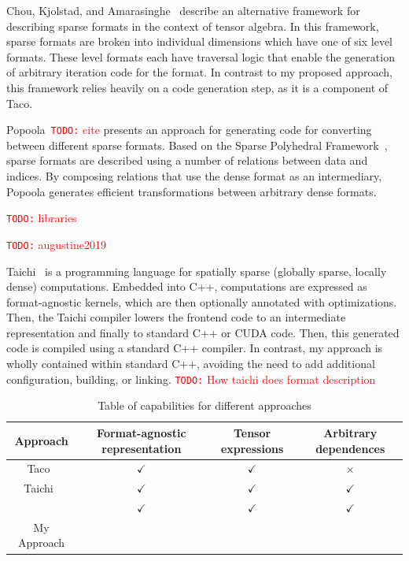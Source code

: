 \documentclass{article}
\newcommand{\todo}[1]{{\textcolor{red}{{\tt{TODO:}}\,\,#1 }}}
\newcommand{\nc}[0]{\todo{cite}}
\newcommand{\yes}[0]{$\checkmark$}
\newcommand{\no}[0]{$\times$}
\begin{document}
Chou, Kjolstad, and Amarasinghe~\cite{chou2018format} describe an alternative framework for describing sparse formats in the context of tensor algebra. 
In this framework, sparse formats are broken into individual dimensions which have one of six level formats. 
These level formats each have traversal logic that enable the generation of arbitrary iteration code for the format.
In contrast to my proposed approach, this framework relies heavily on a code generation step, as it is a component of Taco.

Popoola~\nc presents an approach for generating code for converting between different sparse formats.
Based on the Sparse Polyhedral Framework~\cite{strout2018sparse}, sparse formats are described using a number of relations between data and indices. 
By composing relations that use the dense format as an intermediary, Popoola generates efficient transformations between arbitrary dense formats.


\todo{libraries}




\todo{augustine2019}



Taichi~\cite{hu2019taichi} is a programming language for spatially sparse (globally sparse, locally dense) computations.
Embedded into C++, computations are expressed as format-agnostic kernels, which are then optionally annotated with optimizations.
Then, the Taichi compiler lowers the frontend code to an intermediate representation and finally to standard C++ or CUDA code. 
Then, this generated code is compiled using a standard C++ compiler.
In contrast, my approach is wholly contained within standard C++, avoiding the need to add additional configuration, building, or linking.
\todo{How taichi does format description}








\begin{table}
\begin{tabular}{|c|c|c|c|}
\hline
Approach & Format-agnostic representation & Tensor expressions & Arbitrary dependences \\
\hline
Taco~\cite{kjolstad2017tensor} & \yes & \yes & \no \\
Taichi~\cite{hu2019taichi} & \yes & \yes & \yes \\
\cite{ahmed2000framework} & \yes & \yes & \yes \\ 
My Approach & & & 
    
\end{tabular}
\caption{Table of capabilities for different approaches}
\label{MagicTable}
\end{table}
\end{document}
